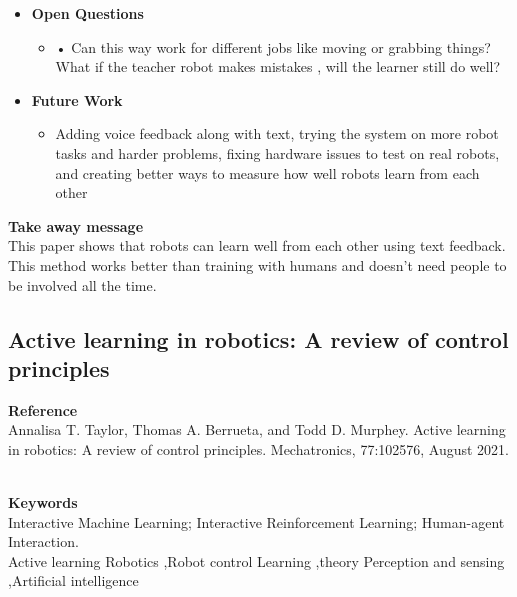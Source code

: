 \documentclass[report.tex]{subfiles}
\begin{document}
\begin{itemize}
    \item \noindent\textbf {Open Questions}
    \begin{itemize}
        \item     • Can this way work for different jobs like moving or grabbing things? What if the teacher robot makes mistakes , will the learner still do well? 

    \end{itemize}
    
    \item \noindent\textbf{Future Work}
    \begin{itemize}
        \item Adding voice feedback along with text, trying the system on more robot tasks and harder problems, fixing hardware issues to test on real robots, and creating better ways to measure how well robots learn from each other
        
    \end{itemize}
\end{itemize}


\noindent\textbf{Take away message}  \\
This paper shows that robots can learn well from each other using text feedback. This method works better than training with humans and doesn’t need people to be involved all the time.

















\subsection{Active learning in robotics: A review of control principles} 

\noindent\textbf{Reference} \\
\cite{taylor_active_2021}Annalisa T. Taylor, Thomas A. Berrueta, and Todd D. Murphey. Active learning in robotics: A review of control principles. Mechatronics, 77:102576, August 2021.

\\


\noindent\textbf{Keywords} \\
Interactive Machine Learning; Interactive Reinforcement Learning; Human-agent Interaction.
   \\Active learning Robotics ,Robot control Learning ,theory Perception and sensing ,Artificial intelligence
\end{document}
